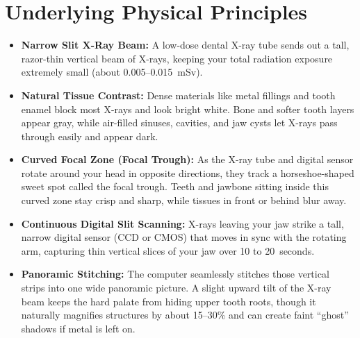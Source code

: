 \section{Underlying Physical Principles}
\begin{itemize}
\item \textbf{Narrow Slit X-Ray Beam:} A low-dose dental X-ray tube sends out a tall, razor-thin vertical beam of X-rays, keeping your total radiation exposure extremely small (about 0.005--0.015~mSv).
\item \textbf{Natural Tissue Contrast:} Dense materials like metal fillings and tooth enamel block most X-rays and look bright white. Bone and softer tooth layers appear gray, while air-filled sinuses, cavities, and jaw cysts let X-rays pass through easily and appear dark.
\item \textbf{Curved Focal Zone (Focal Trough):} As the X-ray tube and digital sensor rotate around your head in opposite directions, they track a horseshoe-shaped sweet spot called the focal trough. Teeth and jawbone sitting inside this curved zone stay crisp and sharp, while tissues in front or behind blur away.
\item \textbf{Continuous Digital Slit Scanning:} X-rays leaving your jaw strike a tall, narrow digital sensor (CCD or CMOS) that moves in sync with the rotating arm, capturing thin vertical slices of your jaw over 10 to 20~seconds.
\item \textbf{Panoramic Stitching:} The computer seamlessly stitches those vertical strips into one wide panoramic picture. A slight upward tilt of the X-ray beam keeps the hard palate from hiding upper tooth roots, though it naturally magnifies structures by about 15--30\% and can create faint ``ghost'' shadows if metal is left on.
\end{itemize}

